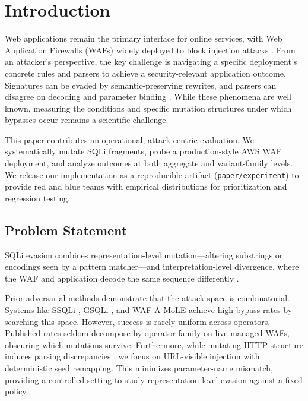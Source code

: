 \section{Introduction}
Web applications remain the primary interface for online services, with Web Application Firewalls (WAFs) widely deployed to block injection attacks \cite{owasp-crs,waf-survey}. From an attacker's perspective, the key challenge is navigating a specific deployment's concrete rules and parsers to achieve a security-relevant application outcome. Signatures can be evaded by semantic-preserving rewrites, and parsers can disagree on decoding and parameter binding \cite{mutation-sqli-evasion,parsing-discrepancies,request-smuggling}. While these phenomena are well known, measuring the conditions and specific mutation structures under which bypasses occur remains a scientific challenge.

This paper contributes an operational, attack-centric evaluation. We systematically mutate SQLi fragments, probe a production-style AWS WAF deployment, and analyze outcomes at both aggregate and variant-family levels. We release our implementation as a reproducible artifact (\texttt{paper/experiment}) to provide red and blue teams with empirical distributions for prioritization and regression testing.

\subsection{Problem Statement}
SQLi evasion combines representation-level mutation---altering substrings or encodings seen by a pattern matcher---and interpretation-level divergence, where the WAF and application decode the same sequence differently \cite{akhavani2025waffled}. 

Prior adversarial methods demonstrate that the attack space is combinatorial. Systems like SSQLi \cite{guan2023ssqli}, GSQLi \cite{khan2024gsqli}, and WAF-A-MoLE \cite{demetrio2020wafamole} achieve high bypass rates by searching this space. However, success is rarely uniform across operators. Published rates seldom decompose by operator family on live managed WAFs, obscuring which mutations survive. Furthermore, while mutating HTTP structure induces parsing discrepancies \cite{akhavani2025waffled}, we focus on URL-visible injection with deterministic seed remapping. This minimizes parameter-name mismatch, providing a controlled setting to study representation-level evasion against a fixed policy.

